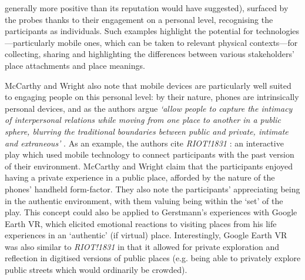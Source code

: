 generally more positive than its reputation would have suggested), surfaced by the probes thanks to their engagement on a personal level, recognising the participants as individuals. Such examples highlight the potential for technologies---particularly mobile ones, which can be taken to relevant physical contexts---for collecting, sharing and highlighting the differences between various stakeholders' place attachments and place meanings.

McCarthy and Wright also note that mobile devices are particularly well suited to engaging people on this personal level: by their nature, phones are intrinsically personal devices, and as the authors argue \textit{`allow people to capture the intimacy of interpersonal relations while moving from one place to another in a public sphere, blurring the traditional boundaries between public and private, intimate and extraneous'} \citep{McCarthy2005}. As an example, the authors cite \textit{RIOT!1831} \citep{Blythe2006}: an interactive play which used mobile technology to connect participants with the past version of their environment. McCarthy and Wright claim that the participants enjoyed having a private experience in a public place, afforded by the nature of the phones' handheld form-factor. They also note the participants' appreciating being in the authentic environment, with them valuing being within the `set' of the play. This concept could also be applied to Gerstmann's experiences with Google Earth VR, which elicited emotional reactions to visiting places from his life experiences in an `authentic' (if virtual) place. Interestingly, Google Earth VR was also similar to \textit{RIOT!1831} in that it allowed for private exploration and reflection in digitised versions of public places (e.g. being able to privately explore public streets which would ordinarily be crowded).

